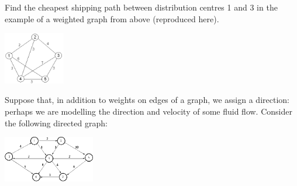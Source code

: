 \begin{questions}
  \question Find the cheapest shipping path between distribution centres 1 and 3 in the example of a weighted graph from above (reproduced here).
            \begin{center}
              \includegraphics[width=0.2\textwidth]{graph1}
            \end{center}
  \question Suppose that, in addition to weights on edges of a graph, we assign a direction: perhaps we are modelling the direction and velocity
            of some fluid flow. Consider the following directed graph:
            \begin{center}
              \includegraphics[width=0.3\textwidth]{digraph}
            \end{center}
\end{questions}
